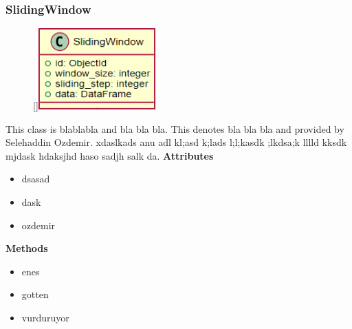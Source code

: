 \subsubsection{SlidingWindow}
\begin{figure}
    \raisebox{0pt}[\dimexpr{}\baselineskip\relax]{\includegraphics[width=4.5cm]{classes/model-management/15.png}}
\end{figure} 
\par
This class is blablabla and bla bla bla. This denotes bla bla bla and provided by Selehaddin Ozdemir. xdaslkads anu adl kl;asd k;lads l;l;kasdk ;lkdsa;k lllld kksdk mjdask hdaksjhd haso sadjh salk da.
\newline
\newline
\textbf{Attributes}
\begin{itemize}
    \item dsasad
    \item dask
    \item ozdemir
\end{itemize}
\textbf{Methods}
\begin{itemize}
    \item enes
    \item gotten
    \item vurduruyor
\end{itemize}


